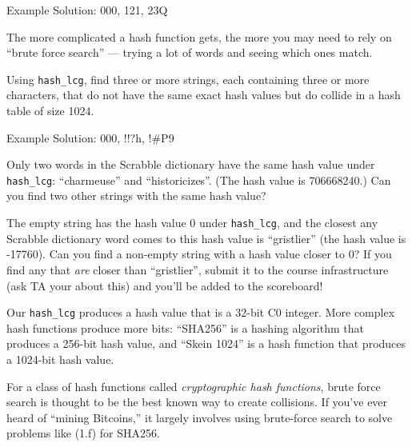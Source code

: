 \begin{solution}
Example Solution: 000, 121, 23Q
\end{solution}

The more complicated a hash function gets, the more you may need to
rely on ``brute force search'' --- trying a lot of words and seeing
which ones match.

\begin{part}
  Using \lstinline'hash_lcg', find three or more strings, each
  containing three or more characters, that do not have the same exact
  hash values but do collide in a hash table of size 1024.
\end{part}

\begin{solution}
Example Solution: 000, !!?h, !\#P9
\end{solution}

\begin{part}
  Only two words in the Scrabble dictionary have the same hash value
  under \lstinline'hash_lcg': ``charmeuse'' and ``historicizes''. (The
  hash value is 706668240.) Can you find two other strings with the
  same hash value?
\end{part}

\begin{part}
The empty string has the hash value 0 under \lstinline'hash_lcg', and the closest
any Scrabble dictionary word comes to this hash value is ``gristlier'' (the
hash value is -17760). Can you find a non-empty string with a hash value closer
to 0? If you find any that \emph{are} closer than ``gristlier'', submit it to
the course infrastructure (ask TA your about this) and you'll be added
to the scoreboard!
\end{part}

Our \lstinline'hash_lcg' produces a hash value that is a 32-bit C0
integer. More complex hash functions produce more bits: ``SHA256'' is
a hashing algorithm that produces a 256-bit hash value, and ``Skein
1024'' is a hash function that produces a 1024-bit hash value.

For a class of hash functions called \emph{cryptographic hash
  functions}, brute force search is thought to be the best known way
to create collisions. If you've ever heard of ``mining Bitcoins,'' it
largely involves using brute-force search to solve problems like (1.f)
for SHA256.
